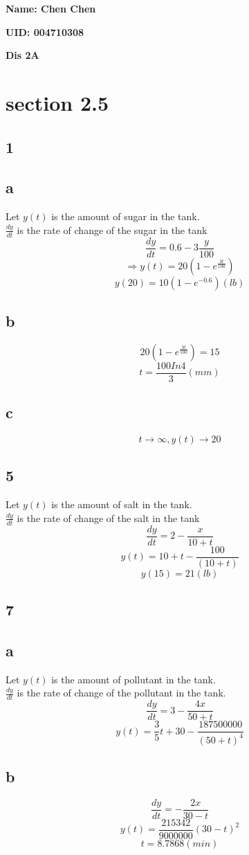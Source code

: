 \documentclass[12pt, a4paper]{IEEEtran}
\begin{document}
    \centerline{\textbf{Name: Chen Chen}}
    \centerline{\textbf{UID: 004710308}}
    \centerline{\textbf{Dis 2A}}
\section *{section 2.5}
\subsection*{1}

\subsection*{a}
Let $y(t)$ is the amount of sugar in the tank.\\
$\frac{dy}{dt}$ is the rate of change of the sugar in the tank
$$\frac{dy}{dt}=0.6-3\frac{y}{100}$$
$$\Rightarrow y(t)=20(1-e^{\frac{3t}{100}})$$
$$y(20)=10(1-e^{-0.6})(lb)$$

\subsection*{b}
$$20(1-e^{\frac{3t}{100}})=15$$
$$t=\frac{100In4}{3}(mm)$$ 

\subsection*{c}
$$t\rightarrow \infty, y(t)\rightarrow 20$$

\subsection*{5}
Let $y(t)$ is the amount of salt in the tank.\\
$\frac{dy}{dt}$ is the rate of change of the salt in the tank
$$\frac{dy}{dt}=2-\frac{x}{10+t}$$
$$y(t)=10+t-\frac{100}{(10+t)}$$
$$y(15)=21(lb)$$

\subsection*{7}
\subsection*{a}
Let $y(t)$ is the amount of pollutant in the tank.\\
$\frac{dy}{dt}$ is the rate of change of the pollutant in the tank.
$$\frac{dy}{dt}=3-\frac{4x}{50+t}$$
$$y(t)=\frac{3}{5}t+30-\frac{187500000}{(50+t)^4}$$
\subsection*{b}
$$\frac{dy}{dt}=-\frac{2x}{30-t}$$
$$y(t)=\frac{215342}{9000000}(30-t)^2$$
$$t=8.7868(min)$$
\end{document}
